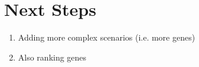 \documentclass[12pt, a4paper]{article}
\begin{document}
\pagebreak
\section{Next Steps}
\begin{enumerate}
  \item Adding more complex scenarios (i.e. more genes)
  \item Also ranking genes
\end{enumerate}

    
\end{document}
